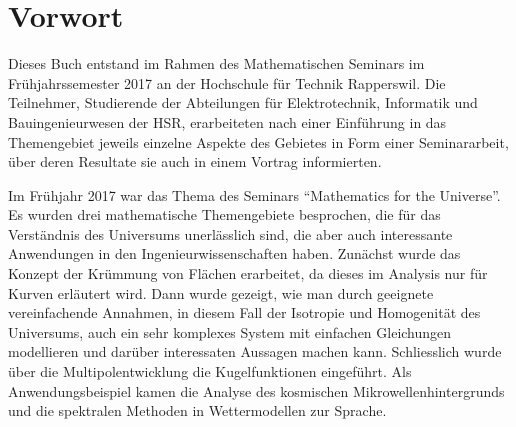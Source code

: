%
%
%
\chapter*{Vorwort}
\rhead{}
Dieses Buch entstand im Rahmen des Mathematischen Seminars
im Frühjahrssemester 2017 an der Hochschule für Technik Rapperswil.
Die Teilnehmer, Studierende der Abteilungen für Elektrotechnik,
Informatik und Bauingenieurwesen der
HSR, erarbeiteten nach einer Einführung in das Themengebiet jeweils
einzelne Aspekte des Gebietes in Form einer Seminararbeit, über
deren Resultate sie auch in einem Vortrag informierten. 

Im Frühjahr 2017 war das Thema des Seminars ``Mathematics for
the Universe''.
Es wurden drei mathematische Themengebiete besprochen, die für
das Verständnis des Universums unerlässlich sind, die aber auch
interessante Anwendungen in den Ingenieurwissenschaften haben.
Zunächst wurde das Konzept der Krümmung von Flächen erarbeitet,
da dieses im Analysis nur für Kurven erläutert wird.
Dann wurde gezeigt, wie man durch geeignete vereinfachende Annahmen,
in diesem Fall der Isotropie und Homogenität des Universums, auch
ein sehr komplexes System mit einfachen Gleichungen modellieren
und darüber interessaten Aussagen machen kann.
Schliesslich wurde über die Multipolentwicklung die Kugelfunktionen
eingeführt.
Als Anwendungsbeispiel kamen die Analyse des kosmischen Mikrowellenhintergrunds
und die spektralen Methoden in Wettermodellen zur Sprache.

%
%
%

